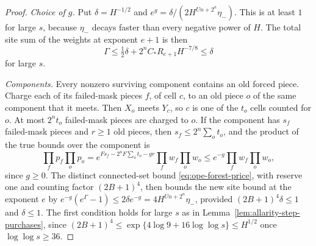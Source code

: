 \begin{proof}
\emph{Choice of $g$.} Put $\delta=H^{-1/2}$ and
$e^g=\delta/(2H^{Un+2^n}\eta_-)$. This is at least $1$ for large $s$,
because $\eta_-$ decays faster than every negative power of $H$. The total
site sum of the weights at exponent $e+1$ is then
\[
 \Gamma\le\tfrac12\delta+2^nC_*R_{e+1}H^{-7/8}\le\delta
\]
for large $s$.

\emph{Components.} Every nonzero surviving component contains an old
forced piece. Charge each of its failed-mask pieces $f$, of cell $c$, to an
old piece $o$ of the same component that it meets. Then $X_o$ meets $Y_c$,
so $c$ is one of the $t_o$ cells counted for $o$. At most $2^nt_o$
failed-mask pieces are charged to $o$. If the component has $s_f$
failed-mask pieces and $r\ge1$ old pieces, then $s_f\le2^n\sum_ot_o$, and
the product of the true bounds over the component is
\[
 \prod_fp_f\prod_op_o
 =e^{Fs_f-2^nF\sum_ot_o-gr}\prod_fw_f\prod_ow_o
 \le e^{-g}\prod_fw_f\prod_ow_o ,
\]
since $g\ge0$. The distinct connected-set
bound \eqref{eq:ope-forest-price}, with reserve one and counting factor
$(2B+1)^4$, then bounds the new site bound at the exponent $e$ by
$e^{-g}(e^\Gamma-1)\le2\delta e^{-g}=4H^{Un+2^n}\eta_-$, provided
$(2B+1)^4\delta\le1$ and $\delta\le1$. The first condition holds for large
$s$ as in Lemma~\ref{lem:allarity-step-purchases}, since
$(2B+1)^4\le\exp\{4\log9+16\log\log s\}\le H^{1/2}$ once
$\log\log s\ge36$.
\end{proof}

